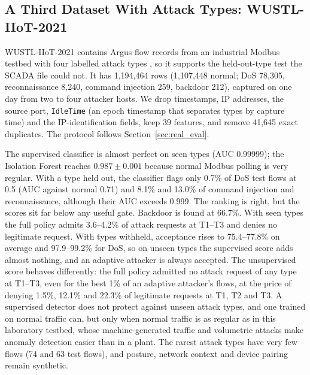 \subsection{A Third Dataset With Attack Types: WUSTL-IIoT-2021}\label{sec:wustl21_eval}
WUSTL-IIoT-2021 contains Argus flow records from an industrial Modbus testbed with four labelled attack types \cite{zolanvari2019vulnerability,zolanvari2021wustl}, so it supports the held-out-type test the SCADA file could not. It has 1{,}194{,}464 rows (1{,}107{,}448 normal; DoS 78{,}305, reconnaissance 8{,}240, command injection 259, backdoor 212), captured on one day from two to four attacker hosts. We drop timestamps, IP addresses, the source port, \texttt{IdleTime} (an epoch timestamp that separates types by capture time) and the IP-identification fields, keep 39 features, and remove 41{,}645 exact duplicates. The protocol follows Section~\ref{sec:real_eval}.

The supervised classifier is almost perfect on seen types (AUC 0.99999); the Isolation Forest reaches $0.987\pm0.001$ because normal Modbus polling is very regular. With a type held out, the classifier flags only 0.7\% of DoS test flows at 0.5 (AUC against normal 0.71) and 8.1\% and 13.0\% of command injection and reconnaissance, although their AUC exceeds 0.999. The ranking is right, but the scores sit far below any useful gate. Backdoor is found at 66.7\%. With seen types the full policy admits 3.6--4.2\% of attack requests at T1--T3 and denies no legitimate request. With types withheld, acceptance rises to 75.4--77.8\% on average and 97.9--99.2\% for DoS, so on unseen types the supervised score adds almost nothing, and an adaptive attacker is always accepted. The unsupervised score behaves differently: the full policy admitted no attack request of any type at T1--T3, even for the best 1\% of an adaptive attacker's flows, at the price of denying 1.5\%, 12.1\% and 22.3\% of legitimate requests at T1, T2 and T3. A supervised detector does not protect against unseen attack types, and one trained on normal traffic can, but only when normal traffic is as regular as in this laboratory testbed, whose machine-generated traffic and volumetric attacks make anomaly detection easier than in a plant. The rarest attack types have very few flows (74 and 63 test flows), and posture, network context and device pairing remain synthetic.

\begin{table}[t]
\centering
\caption{WUSTL-IIoT-2021: legitimate requests allowed and attack requests accepted (\%) under the full policy, as means over four attack types; ``Thr.-only'' is the threshold-only policy on the held-out supervised scores}
\label{tab:wustl21}
\scriptsize
\setlength{\tabcolsep}{2.5pt}

\end{table}

